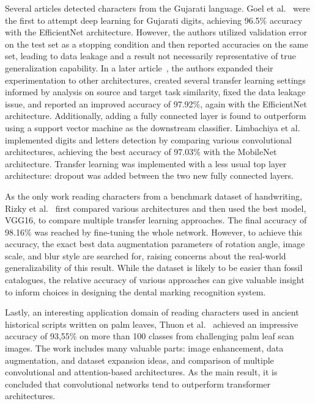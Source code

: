 \documentclass[english,twoside,openright]{UH_DS_MSc}
\begin{document}
Several articles detected characters from the Gujarati language.
Goel et al.~\cite{10goelGujarati} were the first to attempt deep learning for Gujarati digits, 
achieving 96.5\% accuracy with the EfficientNet architecture. However, the authors utilized 
validation error on the test set as a stopping condition and then reported accuracies 
on the same set, leading to data leakage and a result not necessarily representative of true
generalization capability. In a later article~\cite{8goelGujarati2023}, the authors expanded 
their experimentation to other architectures, created several transfer learning settings informed 
by analysis on source and target task similarity, fixed the data leakage issue, and reported an 
improved accuracy of 97.92\%, again with the EfficientNet architecture. Additionally, adding a fully
connected layer is found to outperform using a support vector machine as the downstream classifier.
Limbachiya et al.~\cite{2limbachiyaGujarati} implemented digits and letters detection by comparing various convolutional architectures,
 achieving the best accuracy of 97.03\% with the MobileNet architecture. Transfer learning was implemented with a
  less usual top layer architecture: dropout was added between the two new fully connected layers.

As the only work reading characters from a benchmark dataset of handwriting, Rizky et al.~\cite{7rizkybasicCnnTransfer}
first compared various architectures and then used the best model, VGG16, to compare multiple transfer learning 
approaches. The final accuracy of 98.16\% was reached by fine-tuning the whole network. However, to achieve this accuracy, the exact best data augmentation parameters of 
rotation angle, image scale, and blur style are searched for, raising concerns about the real-world generalizability of this result.
 While the dataset is likely to be easier than fossil catalogues, the relative accuracy of
various approaches can give valuable insight to inform choices in designing the dental marking recognition system.

Lastly, an interesting application domain of reading characters used in ancient historical scripts written 
on palm leaves, Thuon et al.~\cite{9thuonPalm} achieved an impressive accuracy of 93,55\% on more than 100 
classes from challenging palm leaf scan images. The work includes many valuable parts: image enhancement,
data augmentation, and dataset expansion ideas, and comparison of multiple convolutional and attention-based 
architectures. As the main result, it is concluded that convolutional networks tend to outperform transformer architectures.
\end{document}
